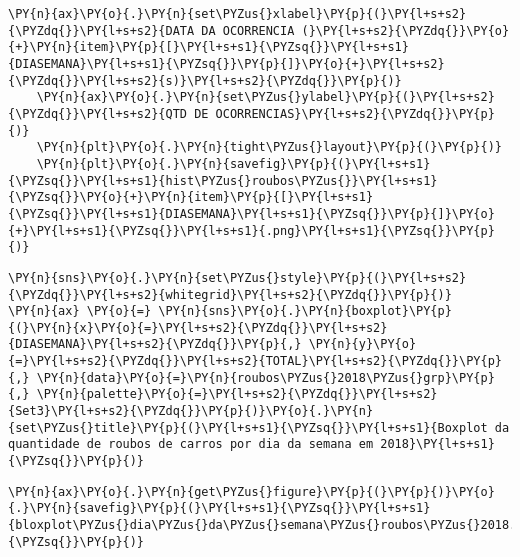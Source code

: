 \begin{tcolorbox}[breakable, size=fbox, boxrule=1pt, pad at break*=1mm,colback=cellbackground, colframe=cellborder]
\begin{Verbatim}[commandchars=\\\{\}]
    \PY{n}{ax}\PY{o}{.}\PY{n}{set\PYZus{}xlabel}\PY{p}{(}\PY{l+s+s2}{\PYZdq{}}\PY{l+s+s2}{DATA DA OCORRENCIA (}\PY{l+s+s2}{\PYZdq{}}\PY{o}{+}\PY{n}{item}\PY{p}{[}\PY{l+s+s1}{\PYZsq{}}\PY{l+s+s1}{DIASEMANA}\PY{l+s+s1}{\PYZsq{}}\PY{p}{]}\PY{o}{+}\PY{l+s+s2}{\PYZdq{}}\PY{l+s+s2}{s)}\PY{l+s+s2}{\PYZdq{}}\PY{p}{)}
    \PY{n}{ax}\PY{o}{.}\PY{n}{set\PYZus{}ylabel}\PY{p}{(}\PY{l+s+s2}{\PYZdq{}}\PY{l+s+s2}{QTD DE OCORRENCIAS}\PY{l+s+s2}{\PYZdq{}}\PY{p}{)}
    \PY{n}{plt}\PY{o}{.}\PY{n}{tight\PYZus{}layout}\PY{p}{(}\PY{p}{)}
    \PY{n}{plt}\PY{o}{.}\PY{n}{savefig}\PY{p}{(}\PY{l+s+s1}{\PYZsq{}}\PY{l+s+s1}{hist\PYZus{}roubos\PYZus{}}\PY{l+s+s1}{\PYZsq{}}\PY{o}{+}\PY{n}{item}\PY{p}{[}\PY{l+s+s1}{\PYZsq{}}\PY{l+s+s1}{DIASEMANA}\PY{l+s+s1}{\PYZsq{}}\PY{p}{]}\PY{o}{+}\PY{l+s+s1}{\PYZsq{}}\PY{l+s+s1}{.png}\PY{l+s+s1}{\PYZsq{}}\PY{p}{)}
\end{Verbatim}
\end{tcolorbox}

    \begin{tcolorbox}[breakable, size=fbox, boxrule=1pt, pad at break*=1mm,colback=cellbackground, colframe=cellborder]
\begin{Verbatim}[commandchars=\\\{\}]
\PY{n}{sns}\PY{o}{.}\PY{n}{set\PYZus{}style}\PY{p}{(}\PY{l+s+s2}{\PYZdq{}}\PY{l+s+s2}{whitegrid}\PY{l+s+s2}{\PYZdq{}}\PY{p}{)}
\PY{n}{ax} \PY{o}{=} \PY{n}{sns}\PY{o}{.}\PY{n}{boxplot}\PY{p}{(}\PY{n}{x}\PY{o}{=}\PY{l+s+s2}{\PYZdq{}}\PY{l+s+s2}{DIASEMANA}\PY{l+s+s2}{\PYZdq{}}\PY{p}{,} \PY{n}{y}\PY{o}{=}\PY{l+s+s2}{\PYZdq{}}\PY{l+s+s2}{TOTAL}\PY{l+s+s2}{\PYZdq{}}\PY{p}{,} \PY{n}{data}\PY{o}{=}\PY{n}{roubos\PYZus{}2018\PYZus{}grp}\PY{p}{,} \PY{n}{palette}\PY{o}{=}\PY{l+s+s2}{\PYZdq{}}\PY{l+s+s2}{Set3}\PY{l+s+s2}{\PYZdq{}}\PY{p}{)}\PY{o}{.}\PY{n}{set\PYZus{}title}\PY{p}{(}\PY{l+s+s1}{\PYZsq{}}\PY{l+s+s1}{Boxplot da quantidade de roubos de carros por dia da semana em 2018}\PY{l+s+s1}{\PYZsq{}}\PY{p}{)}
\end{Verbatim}
\end{tcolorbox}

    \begin{tcolorbox}[breakable, size=fbox, boxrule=1pt, pad at break*=1mm,colback=cellbackground, colframe=cellborder]
\begin{Verbatim}[commandchars=\\\{\}]
\PY{n}{ax}\PY{o}{.}\PY{n}{get\PYZus{}figure}\PY{p}{(}\PY{p}{)}\PY{o}{.}\PY{n}{savefig}\PY{p}{(}\PY{l+s+s1}{\PYZsq{}}\PY{l+s+s1}{bloxplot\PYZus{}dia\PYZus{}da\PYZus{}semana\PYZus{}roubos\PYZus{}2018.png}\PY{l+s+s1}{\PYZsq{}}\PY{p}{)}
\end{Verbatim}
\end{tcolorbox}

